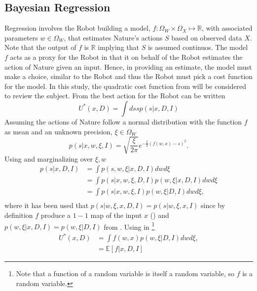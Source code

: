 \subsection{Bayesian Regression}
\label{chp:regression}
Regression involves the Robot building a model, $f: \Omega_W\times \Omega_X\mapsto\mathbb{R}$, with associated parameters $w\in \Omega_W$, that estimates Nature's actions $S$ based on observed data $X$. Note that the output of $f$ is $\mathbb{R}$ implying that $S$ is assumed continuos. The model $f$ acts as a proxy for the Robot in that it on behalf of the Robot estimates the action of Nature given an input. Hence, in providing an estimate, the model must make a choice, similar to the Robot and thus the Robot must pick a cost function for the model. In this study, the quadratic cost function from  will be considered to review the subject. From  the best action for the Robot can be written
\begin{equation}
	U^*(x,D) = \int ds s p(s|x,D,I)
	\label{eq:q1}
\end{equation}
Assuming the actions of Nature follow a normal distribution with the function $f$ as mean and an unknown precision, $\xi\in \Omega_W$
\begin{equation}
	p(s|x,w,\xi,I)=\sqrt{\frac{\xi}{2\pi}} e^{-\frac{\xi}{2}(f(w,x)-s)^2}.
	\label{f_dist}
\end{equation}
Using  and marginalizing over $\xi,w$
\begin{equation}
	\begin{split}
		p(s|x,D,I) &= \int p(s,w,\xi|x,D,I) dw d\xi\\
		& = \int p(s|x,w,\xi,D,I)  p(w,\xi|x,D,I)dw d\xi\\
		& = \int p(s|x,w,\xi,I)  p(w,\xi|D,I)dw d\xi,\\
	\end{split}
	\label{eq:q2}
\end{equation}
where it has been used that $p(s|w,\xi,x,D,I) = p(s|w,\xi,x,I)$ since by definition $f$ produce a $1-1$ map of the input $x$ () and $p(w,\xi|x,D,I) = p(w,\xi|D,I)$ from . Using  in \footnote{Note that a function of a random variable is itself a random variable, so $f$ is a random variable.}
\begin{equation}
	\begin{split}
		U^*(x,D) & = \int f(w,x)  p(w,\xi|D,I) dw d\xi,\\
		& = \mathbb{E}[f|x,D,I]
	\end{split}
	\label{eq:q3}
\end{equation}	
